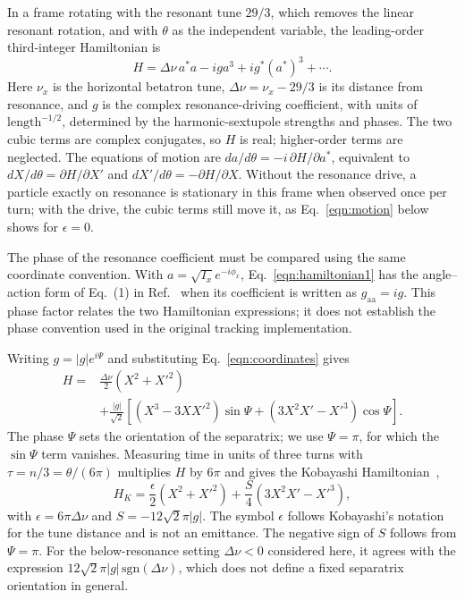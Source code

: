 \documentclass[a4paper,fleqn]{cas-sc}
\begin{document}
In a frame rotating with the resonant tune $29/3$, which removes the linear resonant rotation, and with $\theta$ as the independent variable, the leading-order third-integer Hamiltonian is~\cite{preliminary}
\begin{equation}
 H=\Delta\nu\,a^*a-ig a^3+ig^*(a^*)^3+\cdots.
 \label{eqn:hamiltonian1}
\end{equation}
Here $\nu_x$ is the horizontal betatron tune, $\Delta\nu=\nu_x-29/3$ is its distance from resonance, and $g$ is the complex resonance-driving coefficient, with units of $\mathrm{length}^{-1/2}$, determined by the harmonic-sextupole strengths and phases. The two cubic terms are complex conjugates, so $H$ is real; higher-order terms are neglected. The equations of motion are $da/d\theta=-i\,\partial H/\partial a^*$, equivalent to $dX/d\theta=\partial H/\partial X'$ and $dX'/d\theta=-\partial H/\partial X$. Without the resonance drive, a particle exactly on resonance is stationary in this frame when observed once per turn; with the drive, the cubic terms still move it, as Eq.~\eqref{eqn:motion} below shows for $\epsilon=0$.

The phase of the resonance coefficient must be compared using the same coordinate convention. With $a=\sqrt{I_x}e^{-i\phi_x}$, Eq.~\eqref{eqn:hamiltonian1} has the angle--action form of Eq.~(1) in Ref.~\cite{mu2e} when its coefficient is written as $g_{\mathrm{aa}}=ig$. This phase factor relates the two Hamiltonian expressions; it does not establish the phase convention used in the original tracking implementation.

Writing $g=|g|e^{i\Psi}$ and substituting Eq.~\eqref{eqn:coordinates} gives
\begin{equation}
\begin{split}
 H={}&\frac{\Delta\nu}{2}(X^2+X'^2)\\
 &+\frac{|g|}{\sqrt{2}}\left[(X^3-3XX'^2)\sin\Psi
             +(3X^2X'-X'^3)\cos\Psi\right].
\end{split}
 \label{eqn:hamiltonian2}
\end{equation}
The phase $\Psi$ sets the orientation of the separatrix; we use $\Psi=\pi$, for which the $\sin\Psi$ term vanishes. Measuring time in units of three turns with $\tau=n/3=\theta/(6\pi)$ multiplies $H$ by $6\pi$ and gives the Kobayashi Hamiltonian~\cite{kobayashi},
\begin{equation}
 H_K=\frac{\epsilon}{2}(X^2+X'^2)
       +\frac{S}{4}(3X^2X'-X'^3),
 \label{eqn:kobayashi}
\end{equation}
with $\epsilon=6\pi\Delta\nu$ and $S=-12\sqrt{2}\pi|g|$. The symbol $\epsilon$ follows Kobayashi's notation for the tune distance and is not an emittance. The negative sign of $S$ follows from $\Psi=\pi$. For the below-resonance setting $\Delta\nu<0$ considered here, it agrees with the expression $12\sqrt{2}\pi|g|\,\mathrm{sgn}(\Delta\nu)$, which does not define a fixed separatrix orientation in general.
\end{document}
